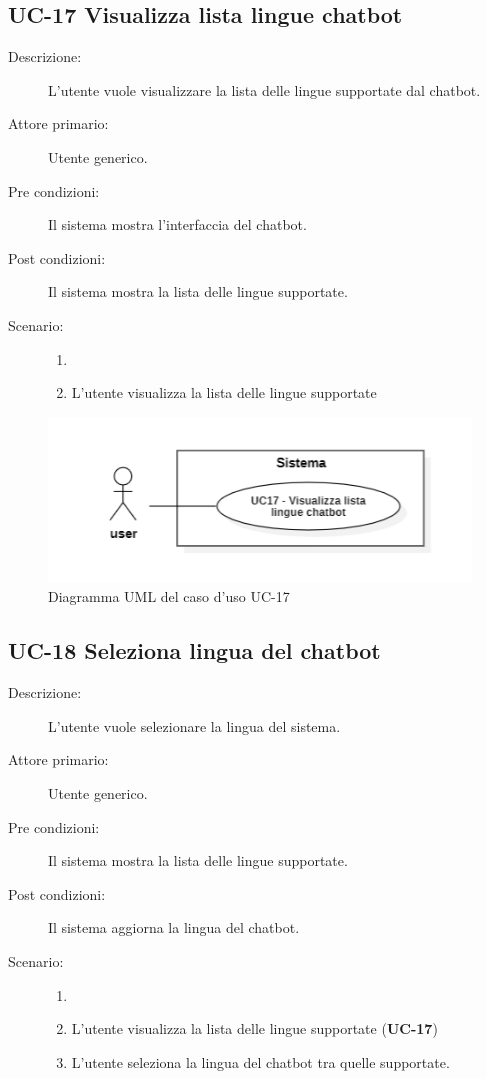 \subsection{UC-17 Visualizza lista lingue chatbot}
\begin{description}
    \item[Descrizione:] L'utente vuole visualizzare la lista delle lingue supportate dal chatbot.
    \item[Attore primario:] Utente generico.
    \item[Pre condizioni:] Il sistema mostra l'interfaccia del chatbot.
    \item[Post condizioni:] Il sistema mostra la lista delle lingue supportate.
    \item[Scenario:]
    \begin{enumerate}
        \item[]
        \item L'utente visualizza la lista delle lingue supportate
    \end{enumerate}
\end{description}

\begin{figure}[H]
    \centering
    \includegraphics[width=0.8\linewidth]{UC17.PNG}
    \caption{Diagramma UML del caso d'uso UC-17}
    \label{fig:UC17}
\end{figure}

\subsection{UC-18 Seleziona lingua del chatbot}
\begin{description}
    \item[Descrizione:] L'utente vuole selezionare la lingua del sistema.
    \item[Attore primario:] Utente generico.
    \item[Pre condizioni:] Il sistema mostra la lista delle lingue supportate.
    \item[Post condizioni:] Il sistema aggiorna la lingua del chatbot.
    \item[Scenario:]
    \begin{enumerate}
        \item[]
        \item L'utente visualizza la lista delle lingue supportate (\textbf{UC-17})
        \item L’utente seleziona la lingua del chatbot tra quelle supportate.
    \end{enumerate}
\end{description}

